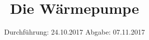 

\subject{V-206}
\title{Die Wärmepumpe}
\date{%
  Durchführung: 24.10.2017
  \hspace{3em}
  Abgabe: 07.11.2017
}



\maketitle
\thispagestyle{empty}
\tableofcontents
\newpage







\printbibliography{}


